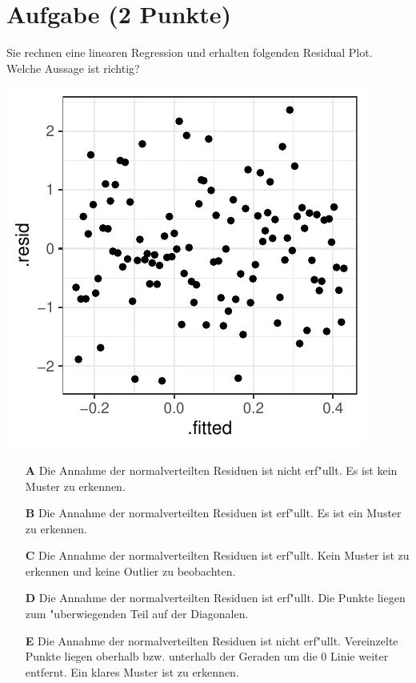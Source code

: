 \documentclass[a4paper, 10pt]{scrartcl}\usepackage[]{graphicx}\usepackage[]{xcolor}
\makeatletter
\def\maxwidth{ %
  \ifdim\Gin@nat@width>\linewidth
    \linewidth
  \else
    \Gin@nat@width
  \fi
}
\makeatother
\begin{document}
\section{Aufgabe \hfill (2 Punkte)}

Sie rechnen eine linearen Regression und erhalten folgenden Residual
Plot. Welche Aussage ist richtig?




{\centering \includegraphics[width=\maxwidth]{img/mc-regression-06-a-1} 

}







\begin{enumerate}
\item [\textbf{A} \msquare] Die Annahme der normalverteilten Residuen ist nicht erf{"u}llt. Es ist kein Muster zu erkennen.
\item [\textbf{B} \msquare] Die Annahme der normalverteilten Residuen ist erf{"u}llt. Es ist ein Muster zu erkennen.
\item [\textbf{C} \msquare] Die Annahme der normalverteilten Residuen ist erf{"u}llt. Kein Muster ist zu erkennen und keine Outlier zu beobachten.
\item [\textbf{D} \msquare] Die Annahme der normalverteilten Residuen ist erf{"u}llt. Die Punkte liegen zum {"u}berwiegenden Teil auf der Diagonalen.
\item [\textbf{E} \msquare] Die Annahme der normalverteilten Residuen ist nicht erf{"u}llt. Vereinzelte Punkte liegen oberhalb bzw. unterhalb der Geraden um die 0 Linie weiter entfernt. Ein klares Muster ist zu erkennen.
\end{enumerate}
\end{document}
